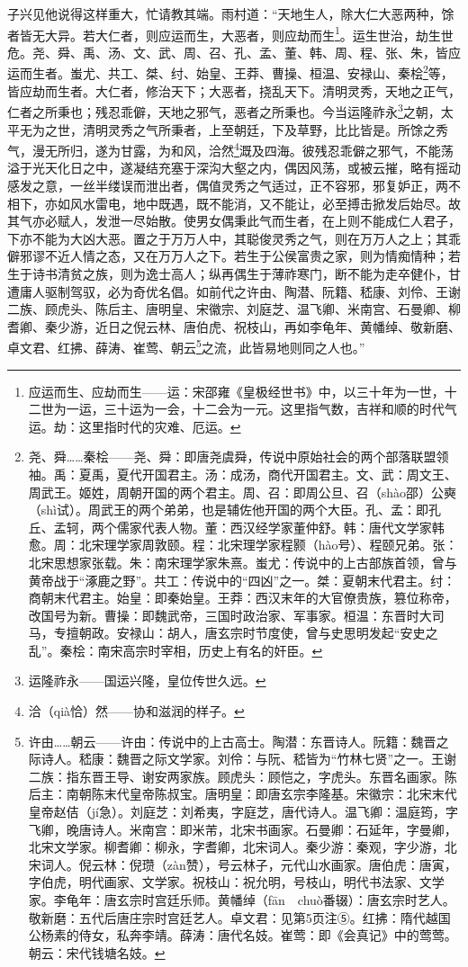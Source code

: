 \par 子兴见他说得这样重大，忙请教其端。雨村道：“天地生人，除大仁大恶两种，馀者皆无大异。若大仁者，则应运而生，大恶者，则应劫而生\footnote{应运而生、应劫而生——运：宋邵雍《皇极经世书》中，以三十年为一世，十二世为一运，三十运为一会，十二会为一元。这里指气数，吉祥和顺的时代气运。劫：这里指时代的灾难、厄运。}。运生世治，劫生世危。尧、舜、禹、汤、文、武、周、召、孔、孟、董、韩、周、程、张、朱，皆应运而生者。蚩尤、共工、桀、纣、始皇、王莽、曹操、桓温、安禄山、秦桧\footnote{尧、舜……秦桧——尧、舜：即唐尧虞舜，传说中原始社会的两个部落联盟领袖。禹：夏禹，夏代开国君主。汤：成汤，商代开国君主。文、武：周文王、周武王。姬姓，周朝开国的两个君主。周、召：即周公旦、召（shào邵）公奭（shì试）。周武王的两个弟弟，也是辅佐他开国的两个大臣。孔、孟：即孔丘、孟轲，两个儒家代表人物。董：西汉经学家董仲舒。韩：唐代文学家韩愈。周：北宋理学家周敦颐。程：北宋理学家程颢（hào号）、程颐兄弟。张：北宋思想家张载。朱：南宋理学家朱熹。蚩尤：传说中的上古部族首领，曾与黄帝战于“涿鹿之野”。共工：传说中的“四凶”之一。桀：夏朝末代君主。纣：商朝末代君主。始皇：即秦始皇。王莽：西汉末年的大官僚贵族，篡位称帝，改国号为新。曹操：即魏武帝，三国时政治家、军事家。桓温：东晋时大司马，专擅朝政。安禄山：胡人，唐玄宗时节度使，曾与史思明发起“安史之乱”。秦桧：南宋高宗时宰相，历史上有名的奸臣。}等，皆应劫而生者。大仁者，修治天下；大恶者，挠乱天下。清明灵秀，天地之正气，仁者之所秉也；残忍乖僻，天地之邪气，恶者之所秉也。今当运隆祚永\footnote{运隆祚永——国运兴隆，皇位传世久远。}之朝，太平无为之世，清明灵秀之气所秉者，上至朝廷，下及草野，比比皆是。所馀之秀气，漫无所归，遂为甘露，为和风，洽然\footnote{洽（qià恰）然——协和滋润的样子。}溉及四海。彼残忍乖僻之邪气，不能荡溢于光天化日之中，遂凝结充塞于深沟大壑之内，偶因风荡，或被云摧，略有摇动感发之意，一丝半缕误而泄出者，偶值灵秀之气适过，正不容邪，邪复妒正，两不相下，亦如风水雷电，地中既遇，既不能消，又不能让，必至搏击掀发后始尽。故其气亦必赋人，发泄一尽始散。使男女偶秉此气而生者，在上则不能成仁人君子，下亦不能为大凶大恶。置之于万万人中，其聪俊灵秀之气，则在万万人之上；其乖僻邪谬不近人情之态，又在万万人之下。若生于公侯富贵之家，则为情痴情种；若生于诗书清贫之族，则为逸士高人；纵再偶生于薄祚寒门，断不能为走卒健仆，甘遭庸人驱制驾驭，必为奇优名倡。如前代之许由、陶潜、阮籍、嵇康、刘伶、王谢二族、顾虎头、陈后主、唐明皇、宋徽宗、刘庭芝、温飞卿、米南宫、石曼卿、柳耆卿、秦少游，近日之倪云林、唐伯虎、祝枝山，再如李龟年、黄幡绰、敬新磨、卓文君、红拂、薛涛、崔莺、朝云\footnote{许由……朝云——许由：传说中的上古高士。陶潜：东晋诗人。阮籍：魏晋之际诗人。嵇康：魏晋之际文学家。刘伶：与阮、嵇皆为“竹林七贤”之一。王谢二族：指东晋王导、谢安两家族。顾虎头：顾恺之，字虎头。东晋名画家。陈后主：南朝陈末代皇帝陈叔宝。唐明皇：即唐玄宗李隆基。宋徽宗：北宋末代皇帝赵佶（jí急）。刘庭芝：刘希夷，字庭芝，唐代诗人。温飞卿：温庭筠，字飞卿，晚唐诗人。米南宫：即米芾，北宋书画家。石曼卿：石延年，字曼卿，北宋文学家。柳耆卿：柳永，字耆卿，北宋词人。秦少游：秦观，字少游，北宋词人。倪云林：倪瓒（zàn赞），号云林子，元代山水画家。唐伯虎：唐寅，字伯虎，明代画家、文学家。祝枝山：祝允明，号枝山，明代书法家、文学家。李龟年：唐玄宗时宫廷乐师。黄幡绰（fān　chuò番辍）：唐玄宗时艺人。敬新磨：五代后唐庄宗时宫廷艺人。卓文君：见第5页注⑤。红拂：隋代越国公杨素的侍女，私奔李靖。薛涛：唐代名妓。崔莺：即《会真记》中的莺莺。朝云：宋代钱塘名妓。}之流，此皆易地则同之人也。”
